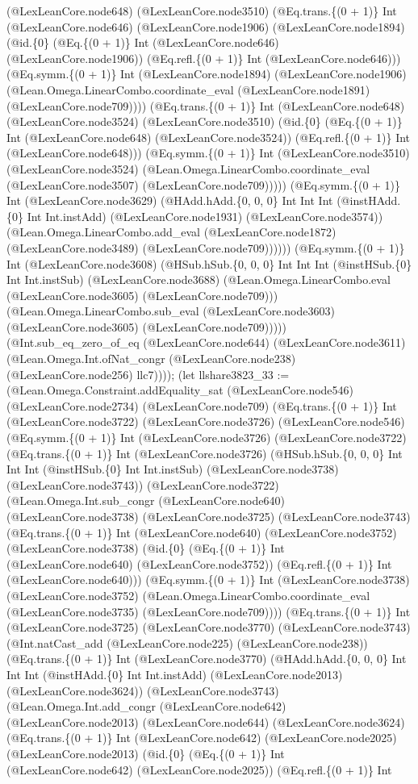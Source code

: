 \documentclass[11pt]{article}
\begin{document}
(@LexLeanCore.node648) (@LexLeanCore.node3510) (@Eq.trans.\{(0 + 1)\} Int (@LexLeanCore.node646) (@LexLeanCore.node1906) (@LexLeanCore.node1894) (@id.\{0\} (@Eq.\{(0 + 1)\} Int (@LexLeanCore.node646) (@LexLeanCore.node1906)) (@Eq.refl.\{(0 + 1)\} Int (@LexLeanCore.node646))) (@Eq.symm.\{(0 + 1)\} Int (@LexLeanCore.node1894) (@LexLeanCore.node1906) (@Lean.Omega.LinearCombo.coordinate\_eval (@LexLeanCore.node1891) (@LexLeanCore.node709)))) (@Eq.trans.\{(0 + 1)\} Int (@LexLeanCore.node648) (@LexLeanCore.node3524) (@LexLeanCore.node3510) (@id.\{0\} (@Eq.\{(0 + 1)\} Int (@LexLeanCore.node648) (@LexLeanCore.node3524)) (@Eq.refl.\{(0 + 1)\} Int (@LexLeanCore.node648))) (@Eq.symm.\{(0 + 1)\} Int (@LexLeanCore.node3510) (@LexLeanCore.node3524) (@Lean.Omega.LinearCombo.coordinate\_eval (@LexLeanCore.node3507) (@LexLeanCore.node709))))) (@Eq.symm.\{(0 + 1)\} Int (@LexLeanCore.node3629) (@HAdd.hAdd.\{0, 0, 0\} Int Int Int (@instHAdd.\{0\} Int Int.instAdd) (@LexLeanCore.node1931) (@LexLeanCore.node3574)) (@Lean.Omega.LinearCombo.add\_eval (@LexLeanCore.node1872) (@LexLeanCore.node3489) (@LexLeanCore.node709)))))) (@Eq.symm.\{(0 + 1)\} Int (@LexLeanCore.node3608) (@HSub.hSub.\{0, 0, 0\} Int Int Int (@instHSub.\{0\} Int Int.instSub) (@LexLeanCore.node3688) (@Lean.Omega.LinearCombo.eval (@LexLeanCore.node3605) (@LexLeanCore.node709))) (@Lean.Omega.LinearCombo.sub\_eval (@LexLeanCore.node3603) (@LexLeanCore.node3605) (@LexLeanCore.node709))))) (@Int.sub\_eq\_zero\_of\_eq (@LexLeanCore.node644) (@LexLeanCore.node3611) (@Lean.Omega.Int.ofNat\_congr (@LexLeanCore.node238) (@LexLeanCore.node256) llc7)))); (let llshare3823\_33 := (@Lean.Omega.Constraint.addEquality\_sat (@LexLeanCore.node546) (@LexLeanCore.node2734) (@LexLeanCore.node709) (@Eq.trans.\{(0 + 1)\} Int (@LexLeanCore.node3722) (@LexLeanCore.node3726) (@LexLeanCore.node546) (@Eq.symm.\{(0 + 1)\} Int (@LexLeanCore.node3726) (@LexLeanCore.node3722) (@Eq.trans.\{(0 + 1)\} Int (@LexLeanCore.node3726) (@HSub.hSub.\{0, 0, 0\} Int Int Int (@instHSub.\{0\} Int Int.instSub) (@LexLeanCore.node3738) (@LexLeanCore.node3743)) (@LexLeanCore.node3722) (@Lean.Omega.Int.sub\_congr (@LexLeanCore.node640) (@LexLeanCore.node3738) (@LexLeanCore.node3725) (@LexLeanCore.node3743) (@Eq.trans.\{(0 + 1)\} Int (@LexLeanCore.node640) (@LexLeanCore.node3752) (@LexLeanCore.node3738) (@id.\{0\} (@Eq.\{(0 + 1)\} Int (@LexLeanCore.node640) (@LexLeanCore.node3752)) (@Eq.refl.\{(0 + 1)\} Int (@LexLeanCore.node640))) (@Eq.symm.\{(0 + 1)\} Int (@LexLeanCore.node3738) (@LexLeanCore.node3752) (@Lean.Omega.LinearCombo.coordinate\_eval (@LexLeanCore.node3735) (@LexLeanCore.node709)))) (@Eq.trans.\{(0 + 1)\} Int (@LexLeanCore.node3725) (@LexLeanCore.node3770) (@LexLeanCore.node3743) (@Int.natCast\_add (@LexLeanCore.node225) (@LexLeanCore.node238)) (@Eq.trans.\{(0 + 1)\} Int (@LexLeanCore.node3770) (@HAdd.hAdd.\{0, 0, 0\} Int Int Int (@instHAdd.\{0\} Int Int.instAdd) (@LexLeanCore.node2013) (@LexLeanCore.node3624)) (@LexLeanCore.node3743) (@Lean.Omega.Int.add\_congr (@LexLeanCore.node642) (@LexLeanCore.node2013) (@LexLeanCore.node644) (@LexLeanCore.node3624) (@Eq.trans.\{(0 + 1)\} Int (@LexLeanCore.node642) (@LexLeanCore.node2025) (@LexLeanCore.node2013) (@id.\{0\} (@Eq.\{(0 + 1)\} Int (@LexLeanCore.node642) (@LexLeanCore.node2025)) (@Eq.refl.\{(0 + 1)\} Int 
\end{document}
